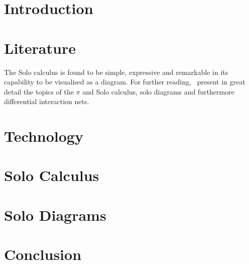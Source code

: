 \documentclass{article}
\begin{document}
    \tableofcontents
    \pagebreak

    \section{Introduction}

    \section{Literature}
        
        
        \begin{remarks}
            The Solo calculus is found to be simple, expressive and remarkable in its capability to be visualised as a diagram.
            For further reading,~\cite{acyclic-solos} present in great detail the topics of the $\pi$ and Solo calculus, solo diagrams and furthermore differential interaction nets.
        \end{remarks}

    \section{Technology}

    \section{Solo Calculus}
        
        
        

    \section{Solo Diagrams}
        
        
        

    \section{Conclusion}
        
\end{document}
